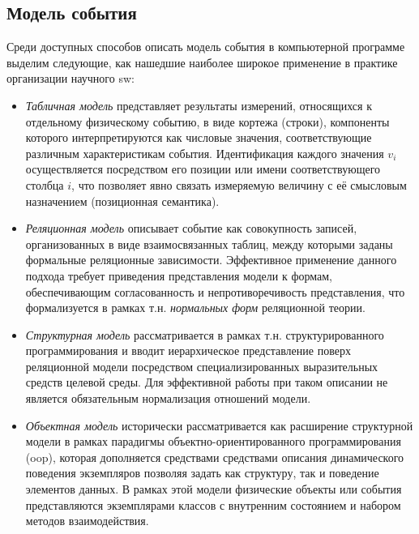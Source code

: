\subsection{Модель события}

Среди доступных способов описать модель события в компьютерной программе выделим
следующие, как нашедшие наиболее широкое применение в практике организации
научного \acrshort{sw}:

\begin{itemize}
    \item \emph{Табличная модель}
    представляет результаты измерений, относящихся к отдельному физическому событию, в виде
    кортежа (строки), компоненты которого интерпретируются как числовые значения,
    соответствующие различным характеристикам события. Идентификация каждого значения
    $v_i$ осуществляется посредством его позиции или имени соответствующего
    столбца $i$, что позволяет явно связать измеряемую величину с её смысловым
    назначением (позиционная семантика).
    \item \emph{Реляционная модель}
    описывает событие как совокупность записей, организованных
    в виде взаимосвязанных таблиц, между которыми заданы формальные
    реляционные зависимости. Эффективное применение данного подхода требует
    приведения представления модели к формам,
    обеспечивающим согласованность и непротиворечивость представления,
    что формализуется в рамках т.н. \emph{нормальных форм} реляционной теории.
    \item \emph{Структурная модель} рассматривается в рамках
    т.н. структурированного %
    программирования и вводит иерархическое представление
    поверх реляционной модели посредством специализированных
    выразительных средств целевой среды. Для эффективной
    работы при таком описании не является обязательным
    нормализация отношений модели.
    \item \emph{Объектная модель} исторически рассматривается как
    расширение структурной модели в рамках парадигмы объектно-ориентированного
    программирования (\acrshort{oop}), которая дополняется средствами
    средствами описания динамического поведения экземпляров
    позволяя задать как структуру,
    так и поведение элементов данных. В рамках этой модели
    физические объекты или события представляются экземплярами
    классов с внутренним состоянием и набором методов взаимодействия.
\end{itemize}

